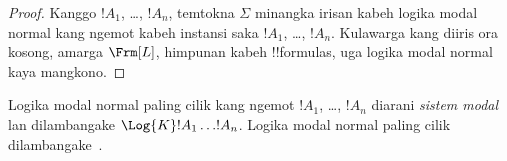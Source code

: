 \documentclass[../../../include/open-logic-section]{subfiles}
\begin{document}
\begin{proof}
  Kanggo $!A_1$, \dots, $!A_n$, temtokna $\Sigma$ minangka irisan
  kabeh logika modal normal kang ngemot kabeh instansi saka
  $!A_1$, \dots, $!A_n$. Kulawarga kang diiris ora kosong, amarga
  $\Frm[L]$, himpunan kabeh !!{formula}s, uga logika modal normal
  kaya mangkono.
\end{proof}

\begin{defn}
Logika modal normal paling cilik kang ngemot $!A_1$, \dots, $!A_n$
diarani \emph{sistem modal} lan dilambangake $\Log{K} !A_1 \dots
!A_n$. Logika modal normal paling cilik dilambangake~.
\end{defn}
\end{document}
